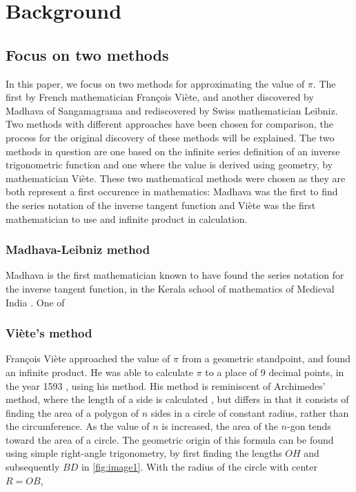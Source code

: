 \section{Background}

\subsection{Focus on two methods}

In this paper, we focus on two methods for approximating the value of $\pi$. 
The first by French mathematician François Viète, and another discovered by Madhava of Sangamagrama and 
rediscovered by Swiss mathematician Leibniz. Two methods with different approaches have been chosen for 
comparison, the process for the original discovery of these methods
will be explained. The two methods in question are one based on 
the infinite series definition of an inverse trigonometric function 
and one where the value is derived using geometry, by mathematician 
Viète. These two mathematical methods were chosen as they are both 
represent a first occurence in mathematics: Madhava was the first to 
find the series notation of the inverse tangent function and Viète was 
the first mathematician to use and infinite product in calculation. 


\subsubsection{Madhava-Leibniz method}

Madhava is the first mathematician known to have found the series notation for 
the inverse tangent function, in the Kerala school of mathematics of Medieval India 
\cite{amermathmonthly}. One of 


\subsubsection{Viète's method}

François Viète approached the value of $\pi$ from a 
geometric standpoint, and found an infinite product. 
He was able to calculate $\pi$ to a place of 9 decimal points, in 
the year 1593 \cite{Kreminski}, using his method. His method is reminiscent 
of Archimedes' method, where the length of a side is calculated \cite{archimedespi}, 
but differs in that it consists of finding the area of a polygon of $n$ sides in a circle of constant 
radius, rather than the circumference. As the value of $n$ is increased, the area of the $n$-gon 
tends toward the area of a circle. The geometric origin of this formula 
can be found using simple right-angle trigonometry, by first finding 
the lengths $OH$ and subsequently $BD$ in \ref{fig:image1}.
With the radius of the circle with center $R = OB$,

